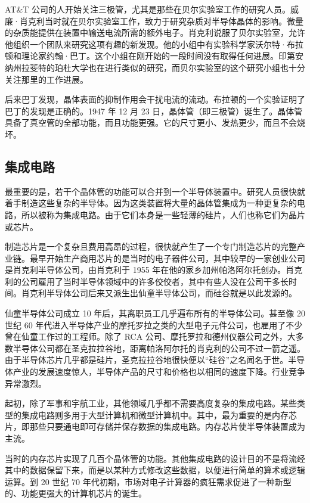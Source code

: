 \documentclass[12pt,UTF8]{ctexbook}
\begin{document}
AT\&T 公司的人开始关注三极管，尤其是那些在贝尔实验室工作的研究人员。威廉·肖克利当时就在贝尔实验室工作，致力于研究杂质对半导体晶体的影响。微量的杂质能提供在装置中输送电流所需的额外电子。肖克利说服了贝尔实验室，允许他组织一个团队来研究这项有趣的新发现。他的小组中有实验科学家沃尔特·布拉顿和理论家约翰·巴丁。这个小组在刚开始的一段时间没有取得任何进展。印第安纳州拉斐特的珀杜大学也在进行类似的研究，而贝尔实验室的这个研究小组也十分关注那里的工作进展。

后来巴丁发现，晶体表面的抑制作用会干扰电流的流动。布拉顿的一个实验证明了巴丁的发现是正确的。1947 年 12 月 23 日，晶体管（即三极管）诞生了。晶体管具备了真空管的全部功能，而且功能更强。它的尺寸更小、发热更少，而且不会烧坏。

\subsection{集成电路}

最重要的是，若干个晶体管的功能可以合并到一个半导体装置中。研究人员很快就着手制造这些复杂的半导体。因为这类装置将大量的晶体管集成为一种更复杂的电路，所以被称为集成电路。由于它们本身是一些轻薄的硅片，人们也称它们为晶片或芯片。

制造芯片是一个复杂且费用高昂的过程，很快就产生了一个专门制造芯片的完整产业链。最早开始生产商用芯片的是当时的电子器件公司，其中较早的一家创业公司是肖克利半导体公司，由肖克利于 1955 年在他的家乡加州帕洛阿尔托创办。肖克利的公司雇用了当时半导体领域中的许多佼佼者，其中有些人没在公司干多长时间。肖克利半导体公司后来又派生出仙童半导体公司，而硅谷就是以此发源的。

仙童半导体公司成立 10 年后，其离职员工几乎遍布所有的半导体公司。甚至像 20 世纪 60 年代进入半导体产业的摩托罗拉之类的大型电子元件公司，也雇用了不少曾在仙童工作过的工程师。除了 RCA 公司、摩托罗拉和德州仪器公司之外，大多数半导体公司都在圣克拉拉谷地，距离帕洛阿尔托的肖克利的公司不过一箭之遥。由于半导体芯片几乎都是硅片，圣克拉拉谷地很快便以“硅谷”之名闻名于世。半导体产业的发展速度惊人，半导体产品的尺寸和价格也以相同的速度下降。行业竞争异常激烈。

起初，除了军事和宇航工业，其他领域几乎都不需要高度复杂的集成电路。某些类型的集成电路则多用于大型计算机和微型计算机中。其中，最为重要的是内存芯片，即那些只要通电即可存储并保存数据的集成电路。内存芯片使半导体装置成为主流。

当时的内存芯片实现了几百个晶体管的功能。其他集成电路的设计目的不是将流经其中的数据保留下来，而是以某种方式修改这些数据，以便进行简单的算术或逻辑运算。到 20 世纪 70 年代初期，市场对电子计算器的疯狂需求促进了一种新型的、功能更强大的计算机芯片的诞生。
\end{document}
